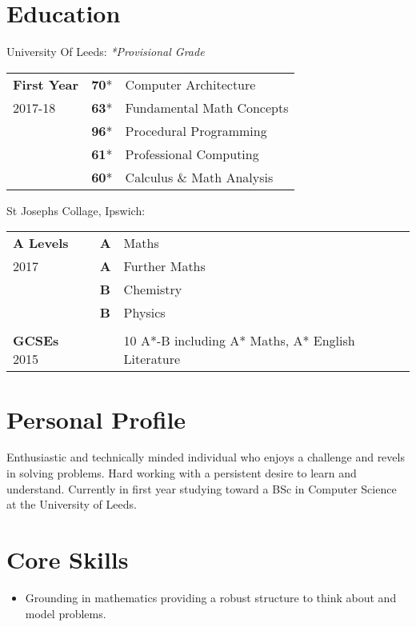 \documentclass[9pt,a4paper]{article}
\begin{document}
\begin{multicols*}{2}
  \section*{Education}
  \vspace*{-.3cm}
  University Of Leeds:
  \newline\textit{*Provisional Grade}
  \vspace*{-6mm}
\begin{center}
  \begin{tabular}{p{2cm} p{0.6cm} p{5.4cm}}
    \textbf{First Year}&\textbf{70}*&Computer Architecture\\
	2017-18&\textbf{63}*&Fundamental Math Concepts\\
	    &\textbf{96}*&Procedural Programming\\
	    &\textbf{61}*&Professional Computing\\
	    &\textbf{60}*&Calculus \& Math Analysis\\
  \end{tabular}
\end{center}
  St Josephs Collage, Ipswich:
  \vspace*{-.6cm}
\begin{center}
  \begin{tabular}{p{2cm} p{0.6cm} p{5.4cm}}
    \textbf{A Levels}&\textbf{A}&Maths\\
	2017&\textbf{A}&Further Maths\\
	    &\textbf{B}&Chemistry\\
	    &\textbf{B}&Physics\\
\\
    \textbf{GCSEs}
        2015&& 10 A*-B including A* Maths, A* English Literature
  \end{tabular}
\end{center}


\section*{Personal Profile}
Enthusiastic and technically minded individual who enjoys a challenge and revels in solving problems.
Hard working with a persistent desire to learn and understand.
Currently in first year studying toward a BSc in Computer Science at the University of Leeds.

\section*{Core Skills}
\begin{itemize}
\item Grounding in mathematics providing a robust structure to think about and model problems.


\end{itemize}
\end{multicols*}
\end{document}
